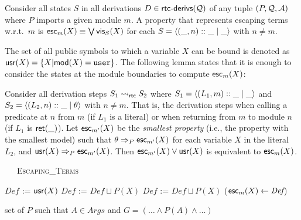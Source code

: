 \documentclass{llncs}
\begin{document}
\begin{definition}
  \label{def:esc-terms}
  Consider all states $S$ in all derivations $D \in \textsf{rtc-derivs}({\cal Q})$
  of any tuple $(P,{\cal Q},{\cal A})$
  where $P$ imports a given module $m$.
  A property that represents escaping terms
  w.r.t.\ $m$ is %
  $\mathsf{esc}_{m}(X) \equiv \bigvee \mathsf{vis}_{S}(X)$
  for each
  $S = \langle (\_,n)::\_ \mid{} \_ \rangle$ with $n \neq m$.
\end{definition}


The set of all public symbols to which a variable $X$ can be bound
is denoted as $\mathsf{usr}(X) = \{ X | \mathsf{mod}(X) = \mbox{\tt user} \}$.
%
The following lemma states that it is enough to consider the states at
the module boundaries to compute $\mathsf{esc}_{m}(X)$:

\begin{lemma}
  \label{lemma:esc-boundaries}
  Consider all derivation steps $S_1 \leadsto_{\mathsf{rtc}} S_2$
  where $S_1 = \langle (L_1,m)::\_ \mid{} \_ \rangle$
  and $S_2 = \langle (L_2,n)::\_ \mid{} \theta \rangle$
  with $n \neq m$.
  That is, the derivation steps when calling a predicate at $n$ from
  $m$ (if $L_1$ is a literal) or when returning from $m$ to module $n$
  (if $L_1$ is $\textsf{ret}(\_)$).
  Let $\mathsf{esc}_{m'}(X)$ be the \emph{smallest property} (i.e., the
  property with the smallest model) such that
  $\theta \Rightarrow_{P} \mathsf{esc}_{m'}(X)$ for each variable $X$ in
  the literal $L_2$, and $\mathsf{usr}(X) \Rightarrow_{P} \mathsf{esc}_{m'}(X)$.
  Then $\mathsf{esc}_{m'}(X) \lor \mathsf{usr}(X)$ is equivalent to
  $\mathsf{esc}_{m}(X)$.
\end{lemma}


\begin{algorithm}[t]
  \caption{\ \ \ \textsc{Escaping\_Terms}\label{fig:esc-terms}}
  \begin{algorithmic}[1]
    \State $\textit{Def}$ := $\mathsf{usr}(X)$
    \State $\textit{Def}$ := $\textit{Def} \sqcup P(X)$
    \EndFor
    \EndFor
    \EndFor
    \State $\textit{Def}$ := $\textit{Def} \sqcup P(X)$
    \EndFor
    \EndFor
    \EndFor
    \State \Return ($\mathsf{esc}_{m}(X) \leftarrow \textit{Def}$)
    \EndFunction

    \State \Return set of $P$ such that $A \in Args$ and $G = (\ldots \wedge P(A) \wedge \ldots)$
    \EndFunction
  \end{algorithmic}
%
\end{algorithm}
\end{document}
